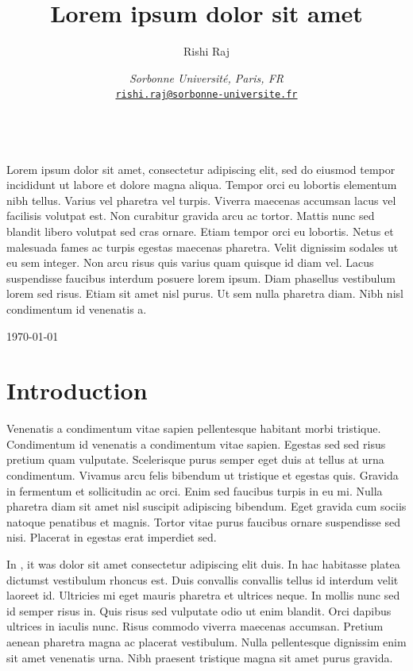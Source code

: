\documentclass[10pt, a4paper]{article}
\title{Lorem ipsum dolor sit amet}
\author{Rishi Raj}
\date{
    \noindent\textit{Sorbonne Université, Paris, FR}\\[0.2cm]
    \href{mailto:rishiraj.1012exp@gmail.com}{\texttt{rishi.raj@sorbonne-universite.fr}}
}
\numberwithin{equation}{section}
\renewenvironment{abstract}
 {\par\noindent\textbf{\abstractname}\ \ignorespaces\\[1ex]}
 {\par\medskip}
\begin{document}
\thispagestyle{empty}
\maketitle

\begin{abstract}
  Lorem ipsum dolor sit amet, consectetur adipiscing elit, sed do eiusmod tempor incididunt ut labore et dolore magna aliqua. Tempor orci eu lobortis elementum nibh tellus. Varius vel pharetra vel turpis. Viverra maecenas accumsan lacus vel facilisis volutpat est. Non curabitur gravida arcu ac tortor. Mattis nunc sed blandit libero volutpat sed cras ornare. Etiam tempor orci eu lobortis. Netus et malesuada fames ac turpis egestas maecenas pharetra. Velit dignissim sodales ut eu sem integer. Non arcu risus quis varius quam quisque id diam vel. Lacus suspendisse faucibus interdum posuere lorem ipsum. Diam phasellus vestibulum lorem sed risus. Etiam sit amet nisl purus. Ut sem nulla pharetra diam. Nibh nisl condimentum id venenatis a.
\end{abstract}

\vfill

\noindent\today

\newpage

\tableofcontents

\setlength{\parindent}{1ex}
\setlength{\parskip}{2ex}
\raggedright

\section{Introduction}

Venenatis a condimentum vitae sapien pellentesque habitant morbi tristique. Condimentum id venenatis a condimentum vitae sapien. Egestas sed sed risus pretium quam vulputate. Scelerisque purus semper eget duis at tellus at urna condimentum. Vivamus arcu felis bibendum ut tristique et egestas quis. Gravida in fermentum et sollicitudin ac orci. Enim sed faucibus turpis in eu mi. Nulla pharetra diam sit amet nisl suscipit adipiscing bibendum. Eget gravida cum sociis natoque penatibus et magnis. Tortor vitae purus faucibus ornare suspendisse sed nisi. Placerat in egestas erat imperdiet sed.

In \cite{Greene:1996cy}, it was dolor sit amet consectetur adipiscing elit duis. In hac habitasse platea dictumst vestibulum rhoncus est. Duis convallis convallis tellus id interdum velit laoreet id. Ultricies mi eget mauris pharetra et ultrices neque. In mollis nunc sed id semper risus in. Quis risus sed vulputate odio ut enim blandit. Orci dapibus ultrices in iaculis nunc. Risus commodo viverra maecenas accumsan. Pretium aenean pharetra magna ac placerat vestibulum. Nulla pellentesque dignissim enim sit amet venenatis urna. Nibh praesent tristique magna sit amet purus gravida.
\end{document}
